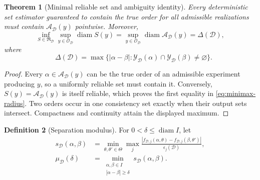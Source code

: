 \documentclass[11pt]{article}
\newtheorem{theorem}{Theorem}
\theoremstyle{definition}
\newtheorem{definition}[theorem]{Definition}
\theoremstyle{remark}
\newcommand{\Aset}{\mathcal A}
\newcommand{\Yset}{\mathcal Y}
\newcommand{\diameter}{\operatorname{diam}}
\begin{document}
\begin{theorem}[Minimal reliable set and ambiguity identity]
\label{thm:ambiguity}
Every deterministic set estimator guaranteed to contain the true order for
all admissible realizations must contain \(\Aset_{\mathcal D}(y)\) pointwise.
Moreover,
\begin{equation}
 \inf_{S\in\mathfrak R_{\mathcal D}}
 \sup_{y\in\mathcal O_{\mathcal D}}\diameter S(y)
 =\sup_{y\in\mathcal O_{\mathcal D}}
 \diameter\Aset_{\mathcal D}(y)=\Delta(\mathcal D),
 \label{eq:minimax-radius}
 \end{equation}
where
\begin{equation}
 \quad
 \Delta(\mathcal D)=
 \max\{|\alpha-\beta|:
 \Yset_{\mathcal D}(\alpha)\cap
 \Yset_{\mathcal D}(\beta)\ne\varnothing\}.
 \label{eq:ambiguity}
\end{equation}
\end{theorem}
\begin{proof}
Every \(\alpha\in\Aset_{\mathcal D}(y)\) can be the true order of an
admissible experiment producing \(y\), so a uniformly reliable set must
contain it.  Conversely, \(S(y)=\Aset_{\mathcal D}(y)\) is itself reliable,
which proves the first equality in \eqref{eq:minimax-radius}.  Two orders occur
in one consistency set exactly when their output sets intersect.  Compactness
and continuity attain the displayed maximum.
\end{proof}

\begin{definition}[Separation modulus]
For \(0<\delta\le\diameter I\), let
\begin{align}
 s_{\mathcal D}(\alpha,\beta)&=
 \min_{\theta,\theta'\in\Theta}
 \max_j
 \frac{|f_{\mathcal D,j}(\alpha,\theta)
       -f_{\mathcal D,j}(\beta,\theta')|}
      {\epsilon_j(\mathcal D)},\\
 \mu_{\mathcal D}(\delta)&=
 \min_{\substack{\alpha,\beta\in I\\|\alpha-\beta|\ge\delta}}
 s_{\mathcal D}(\alpha,\beta).
 \label{eq:mu}
\end{align}
\end{definition}
\end{document}
